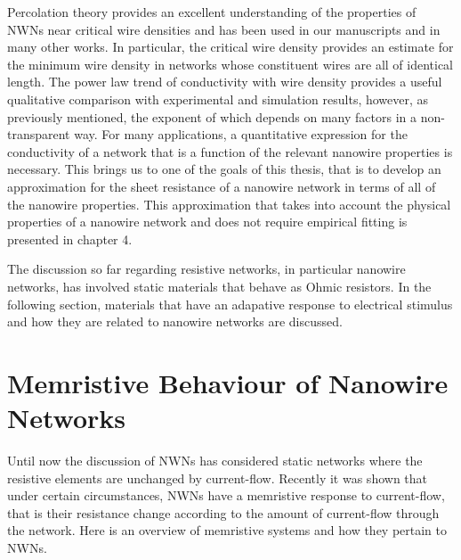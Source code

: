 Percolation theory provides an excellent understanding of the properties of NWNs near critical wire densities and has been used in our manuscripts and in many other works\cite{ocallaco2016,fairfield2016,de2011}. In particular, the critical wire density provides an estimate for the minimum wire density in networks whose constituent wires are all of identical length\cite{fairfield2016,ocallaco2016}. The power law trend of conductivity with wire density provides a useful qualitative comparison with experimental and simulation results, however, as previously mentioned, the exponent of which depends on many factors in a non-transparent way. For many applications, a quantitative expression for the conductivity of a network that is a function of the relevant nanowire properties is necessary. This brings us to one of the goals of this thesis, that is to develop an approximation for the sheet resistance of a nanowire network in terms of all of the nanowire properties. This approximation that takes into account the physical properties of a nanowire network and does not require empirical fitting is presented in chapter 4. 

The discussion so far regarding resistive networks, in particular nanowire networks, has involved static materials that behave as Ohmic resistors. In the following section, materials that have an adapative response to electrical stimulus and how they are related to nanowire networks are discussed. 

\section{Memristive Behaviour of Nanowire Networks}
\label{Sec: Intro Memristance}
Until now the discussion of NWNs has considered static networks where the resistive elements are unchanged by current-flow. Recently it was shown that under certain circumstances, NWNs have a memristive response to current-flow\cite{scaling2018}, that is their resistance change according to the amount of current-flow through the network. Here is an overview of memristive systems and how they pertain to NWNs.

